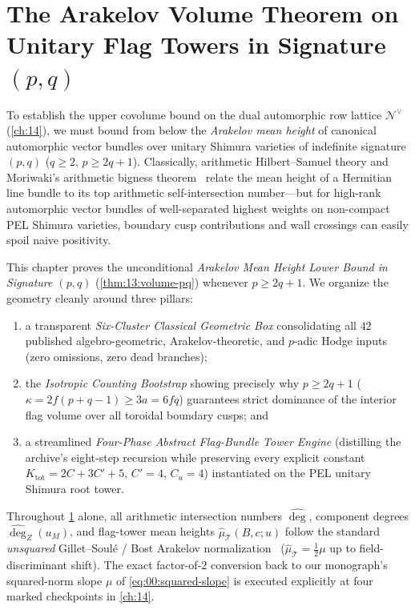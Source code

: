 \chapter{The Arakelov Volume Theorem on Unitary Flag Towers in Signature $(p, q)$}
\label{ch:13}

To establish the upper covolume bound on the dual automorphic row lattice $\mathcal{N}^\vee$ (\cref{ch:14}), we must bound from below the \emph{Arakelov mean height} of canonical automorphic vector bundles over unitary Shimura varieties of indefinite signature $(p, q)$ ($q \ge 2$, $p \ge 2q + 1$). Classically, arithmetic Hilbert--Samuel theory and Moriwaki's arithmetic bigness theorem~\cite{GilletSoule1992,BostGilletSoule1994,Moriwaki2009,Yuan2008,Zhang1995} relate the mean height of a Hermitian line bundle to its top arithmetic self-intersection number—but for high-rank automorphic vector bundles of well-separated highest weights on non-compact PEL Shimura varieties, boundary cusp contributions and wall crossings can easily spoil naive positivity.

This chapter proves the unconditional \emph{Arakelov Mean Height Lower Bound in Signature $(p, q)$} (\cref{thm:13:volume-pq}) whenever $p \ge 2q + 1$. We organize the geometry cleanly around three pillars:
\begin{enumerate}[label=(\roman*)]
\item a transparent \emph{Six-Cluster Classical Geometric Box} consolidating all $42$ published algebro-geometric, Arakelov-theoretic, and $p$-adic Hodge inputs (zero omissions, zero dead branches);
\item the \emph{Isotropic Counting Bootstrap} showing precisely why $p \ge 2q + 1$ ($\kappa = 2f(p+q-1) \ge 3a = 6fq$) guarantees strict dominance of the interior flag volume over all toroidal boundary cusps; and
\item a streamlined \emph{Four-Phase Abstract Flag-Bundle Tower Engine} (distilling the archive's eight-step recursion while preserving every explicit constant $K_{\mathrm{tot}} = 2C + 3C' + 5$, $C' = 4$, $C_u = 4$) instantiated on the PEL unitary Shimura root tower.
\end{enumerate}

\begin{remark}
\label{rem:13:unsquared-warning}
Throughout \cref{ch:13} alone, all arithmetic intersection numbers $\widehat{\deg}$, component degrees $\widehat{\deg}_Z(u_M)$, and flag-tower mean heights $\widehat{\mu}_{\mathcal{T}}(B, c; u)$ follow the standard \emph{unsquared} Gillet--Soul\'e / Bost Arakelov normalization~\cite{GilletSoule1992,BostGilletSoule1994} ($\widehat{\mu}_{\mathcal{T}} = \frac{1}{2}\mu$ up to field-discriminant shift). The exact factor-of-$2$ conversion back to our monograph's squared-norm slope $\mu$ of \eqref{eq:00:squared-slope} is executed explicitly at four marked checkpoints in \cref{ch:14}.
\end{remark}

